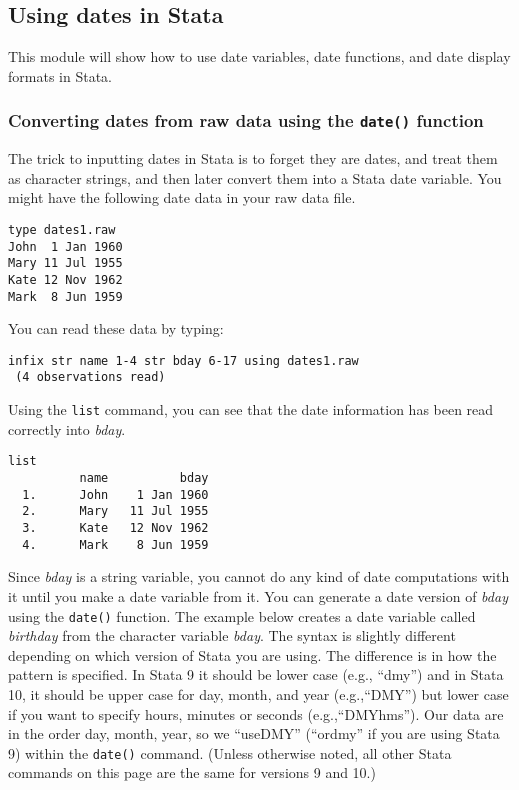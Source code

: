 \subsection{Using dates in Stata}

This module will show how to use date variables, date functions, and date display formats in Stata.

\subsubsection{Converting dates from raw data using the \lstinline{date()} function}

The trick to inputting dates in Stata is to forget they are dates, and treat them as character strings, and then later convert them into a Stata date variable. You might have the following date data in your raw data file.

\begin{lstlisting}
type dates1.raw
John  1 Jan 1960
Mary 11 Jul 1955
Kate 12 Nov 1962
Mark  8 Jun 1959
\end{lstlisting}

You can read these data by typing:

\begin{lstlisting}
infix str name 1-4 str bday 6-17 using dates1.raw
 (4 observations read)
\end{lstlisting}

Using the \lstinline{list} command, you can see that the date information has been read correctly into \textit{bday}.

\begin{lstlisting}
list
          name          bday
  1.      John    1 Jan 1960
  2.      Mary   11 Jul 1955
  3.      Kate   12 Nov 1962
  4.      Mark    8 Jun 1959
\end{lstlisting}

Since \textit{bday} is a string variable, you cannot do any kind of date computations with it until you make a date variable from it. You can generate a date version of \textit{bday} using the \lstinline{date()} function. The example below creates a date variable called \textit{birthday} from the character variable \textit{bday}. The syntax is slightly different depending on which version of Stata you are using. The difference is in how the pattern is specified. In Stata 9 it should be lower case (e.g., ``dmy'') and in Stata 10, it should be upper case for day, month, and year (e.g.,``DMY'') but lower case if you want to specify hours, minutes or seconds (e.g.,``DMYhms''). Our data are in the order day, month, year, so we ``useDMY'' (``ordmy'' if you are using Stata 9) within the \lstinline{date()} command. (Unless otherwise noted, all other Stata commands on this page are the same for versions 9 and 10.)


